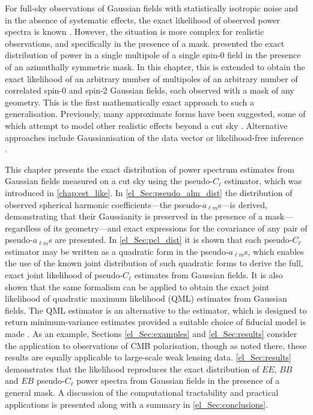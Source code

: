 For full-sky observations of Gaussian fields with statistically isotropic noise and in the absence of systematic effects, the exact likelihood of observed power spectra is known \citep{Percival2006}. However, the situation is more complex for realistic observations, and specifically in the presence of a mask. \citet{Wandelt2001} presented the exact distribution of power in a single multipole of a single spin-0 field in the presence of an azimuthally symmetric mask. In this chapter, this is extended to obtain the exact likelihood of an arbitrary number of multipoles of an arbitrary number of correlated spin-0 and spin-2 Gaussian fields, each observed with a mask of any geometry. This is the first mathematically exact approach to such a generalisation. Previously, many approximate forms have been suggested, some of which attempt to model other realistic effects beyond a cut sky \citep{Percival2006, Hamimeche2008, Mangilli2015, Kalus2016}. Alternative approaches include Gaussianisation of the data vector \citep[e.g.][]{Wang2018} or likelihood-free inference \citep{Alsing2019, Taylor2019}.

This chapter presents the exact distribution of power spectrum estimates from Gaussian fields measured  on a cut sky using the pseudo-$C_\ell$ estimator, which was introduced in \autoref{chap:est_like}. In \autoref{el_Sec:pseudo_alm_dist} the distribution of observed spherical harmonic coefficients---the pseudo-$a_{\ell m}$s---is derived, demonstrating that their Gaussianity is preserved in the presence of a mask---regardless of its geometry---and exact expressions for the covariance of any pair of pseudo-$a_{\ell m}$s are presented.
In \autoref{el_Sec:pcl_dist} it is shown that each pseudo-$C_\ell$ estimator may be written as a quadratic form in the pseudo-$a_{\ell m}$s, which enables the use of the known joint distribution of such quadratic forms to derive the full, exact joint likelihood of pseudo-$C_\ell$ estimates from Gaussian fields.
It is also shown that the same formalism can be applied to obtain the exact joint likelihood of quadratic maximum likelihood (QML) estimates from Gaussian fields. The QML estimator is an alternative to the \pcl{} estimator, which is designed to return minimum-variance estimates provided a suitable choice of fiducial model is made \citep{Tegmark1997}.
As an example, Sections \ref{el_Sec:examples} and \ref{el_Sec:results} consider the application to observations of CMB polarisation, though as noted there, these results are equally applicable to large-scale weak lensing data. \autoref{el_Sec:results} demonstrates that the \pcl{} likelihood reproduces the exact distribution of $EE$, $BB$ and $EB$ pseudo-$C_\ell$ power spectra from Gaussian fields in the presence of a general mask. A discussion of the computational tractability and practical applications is presented along with a summary in \autoref{el_Sec:conclusions}.


